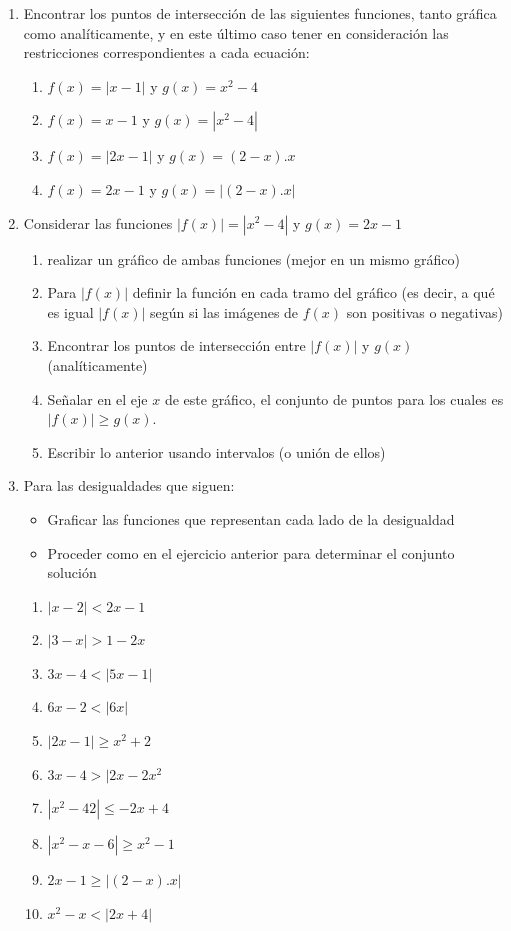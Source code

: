 \documentclass[12pt]{article}
\theoremstyle{definition}
\begin{document}
\begin{enumerate}
\item  Encontrar los puntos de intersección de las siguientes funciones, tanto gráfica como analíticamente, y en este último caso tener en consideración las restricciones correspondientes a cada ecuación:
\begin{multicols}{2}
\begin{enumerate}
\item $f(x) = |x-1|$ y $g(x) = x^{2}-4$
\item $f(x) = x-1 $ y $ g(x) = |x^{2}-4| $
\item $f(x) = |2x-1|$ y $g(x) = (2-x).x $
\item $f(x) = 2x-1$ y $g(x) = |(2-x).x| $
\end{enumerate}
\end{multicols}

\item Considerar las funciones  $|f(x)| = |x^{2}-4|$ y $g(x) = 2x-1$
\begin{enumerate}
\item realizar un gráfico de ambas funciones (mejor en un mismo gráfico)
\item Para $|f(x)|$ definir la función en cada tramo del gráfico (es decir, a qué es igual $|f(x)|$ según si las imágenes de $f(x)$ son positivas o negativas)
\item Encontrar los puntos de intersección entre $|f(x)|$ y $g(x)$ (analíticamente)
\item Señalar en el eje $x$ de este gráfico, el conjunto de puntos para los cuales es $|f(x)| \geq g(x)$.
\item Escribir lo anterior usando intervalos (o unión de ellos)
\end{enumerate}
 

\item Para las desigualdades que siguen:
\begin{itemize}
\item Graficar las funciones que representan cada lado de la desigualdad
\item Proceder como en el ejercicio anterior para determinar el conjunto solución
\end{itemize}
\begin{multicols}{2}
\begin{enumerate}
\item $|x-2| < 2x-1$
\item $|3-x| > 1 - 2x $
\item $3x-4 <|5x-1| $
\item $6x-2 <|6x| $
\item $ |2x-1|\geq x^{2}+2 $
\item $ 3x-4 > |2x - 2x^{2}$
\item $ |x^{2}-42 |\leq -2x+4 $
\item $ |x^{2}-x-6 |\geq x^{2}-1 $
\item $ 2x-1 \geq |(2-x).x|$
\item $ x^{2}-x <|2x+4|$

\end{enumerate}
\end{multicols}

\end{enumerate}
\end{document}
